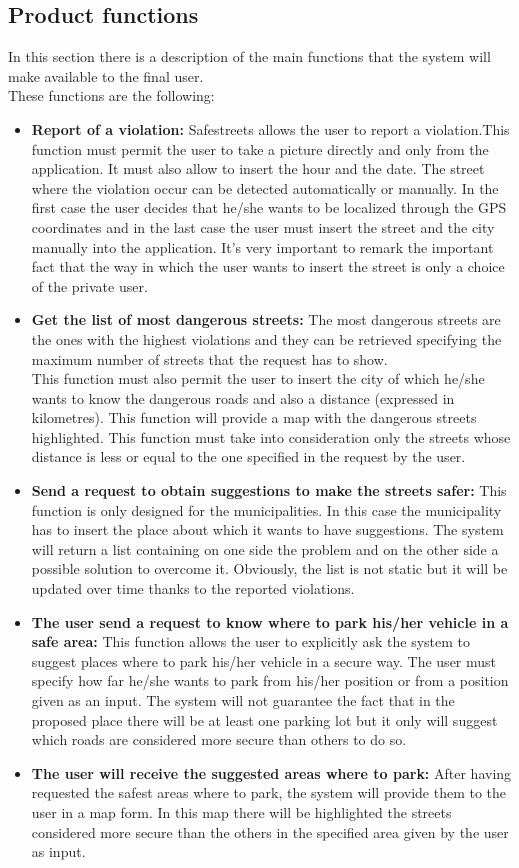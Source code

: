 \documentclass[titlepage]{article}
\begin{document}
\subsection{Product functions}
In this section there is a description of the main functions that the system will make available to the final user.\\
These functions are the following:
\begin{itemize}
	\item \textbf{Report of a violation:} Safestreets allows the user to report a violation.This function must permit the user to take a picture directly and only from the application. It must also allow to insert the hour and the date. The street where the violation occur can be detected automatically or manually. In the first case the user decides that he/she wants to be localized through the GPS coordinates and in the last case the user must insert the street and the city manually into the application. It's very important to remark the important fact that the way in which the user wants to insert the street is only a choice of the private user.
	\item \textbf{Get the list of most dangerous streets: }
	The most dangerous streets are the ones with the highest violations and they can be retrieved specifying the maximum number of streets that the request has to show. \\
This function must also permit the user to insert the city of which he/she wants to know the dangerous roads and also a distance (expressed in kilometres). This function will provide a map with the dangerous streets highlighted. This function must take into consideration only the streets whose distance is less or equal to the one specified in the request by the user. 
	\item \textbf{Send a request to obtain suggestions to make the streets safer:}
	This function is only designed for the municipalities. In this case the municipality has to insert the place about which it wants to have suggestions. The system will return a list containing on one side the problem and on the other side a possible solution to overcome it. Obviously, the list is not static but it will be updated over time thanks to the reported violations.
	\item \textbf{The user send a request to know where to park his/her vehicle in a safe area:}
	This function allows the user to explicitly ask the system to suggest places where to park his/her vehicle in a secure way. 
The user must specify how far he/she wants to park from his/her position or from a position given as an input. The system will not guarantee the fact that in the proposed place there will be at least one parking lot but it only will suggest which roads are considered more secure than others to do so.
	\item \textbf{The user will receive the suggested areas where to park:}
	After having requested the safest areas where to park, the system will provide them to the user in a map form. In this map there will be highlighted the streets considered more secure than the others in the specified area given by the user as input.

\end{itemize}
\end{document}
